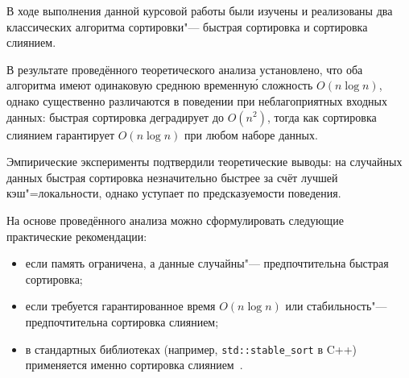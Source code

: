 В ходе выполнения данной курсовой работы были изучены и реализованы два
классических алгоритма сортировки"--- быстрая сортировка и сортировка
слиянием.

В результате проведённого теоретического анализа установлено, что оба
алгоритма имеют одинаковую среднюю временну\'ю сложность $O(n \log n)$,
однако существенно различаются в поведении при неблагоприятных входных
данных: быстрая сортировка деградирует до $O(n^2)$, тогда как сортировка
слиянием гарантирует $O(n \log n)$ при любом наборе данных.

Эмпирические эксперименты подтвердили теоретические выводы: на случайных
данных быстрая сортировка незначительно быстрее за счёт лучшей
кэш"=локальности, однако уступает по предсказуемости поведения.

На основе проведённого анализа можно сформулировать следующие
практические рекомендации:
\begin{itemize}
    \item если память ограничена, а данные случайны"--- предпочтительна
          быстрая сортировка;
    \item если требуется гарантированное время $O(n \log n)$ или
          стабильность"--- предпочтительна сортировка слиянием;
    \item в стандартных библиотеках (например, \texttt{std::stable\_sort}
          в C++) применяется именно сортировка слиянием~\cite{cppreference}.
\end{itemize}
